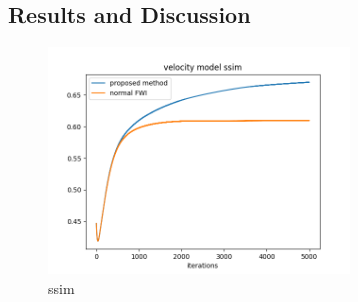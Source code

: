 \subsection{Results and Discussion}\label{subsec:results-and-discussion}


\begin{figure}[htbp]\label{fig:ssim}
\begin{center}
    \includegraphics[width=80mm]{public/ssim}
    \caption{ssim}
\end{center}
\end{figure}
